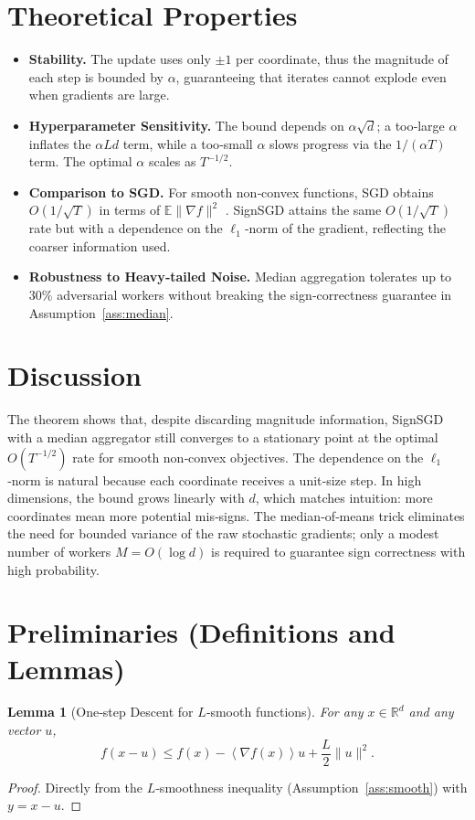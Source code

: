 \documentclass{article}
\newtheorem{lemma}{Lemma}
\newcommand{\E}{\mathbb{E}}
\newcommand{\R}{\mathbb{R}}
\newcommand{\inner}[1]{\left\langle#1\right\rangle}
\begin{document}
\section*{Theoretical Properties}
\begin{itemize}
\item \textbf{Stability.} The update uses only $\pm1$ per coordinate, thus the magnitude of each step is bounded by $\alpha$, guaranteeing that iterates cannot explode even when gradients are large.
\item \textbf{Hyperparameter Sensitivity.} The bound depends on $\alpha\sqrt{d}$; a too‑large $\alpha$ inflates the $ \alpha L d$ term, while a too‑small $\alpha$ slows progress via the $1/(\alpha T)$ term. The optimal $\alpha$ scales as $T^{-1/2}$.
\item \textbf{Comparison to SGD.} For smooth non‑convex functions, SGD obtains $O(1/\sqrt{T})$ in terms of $\E\|\nabla f\|^{2}$ \cite{ghadimi2013stochastic}.  SignSGD attains the same $O(1/\sqrt{T})$ rate but with a dependence on the $\ell_{1}$‑norm of the gradient, reflecting the coarser information used.
\item \textbf{Robustness to Heavy‑tailed Noise.} Median aggregation tolerates up to $30\%$ adversarial workers without breaking the sign‑correctness guarantee in Assumption~\ref{ass:median}.
\end{itemize}

\section*{Discussion}
The theorem shows that, despite discarding magnitude information, SignSGD with a median aggregator still converges to a stationary point at the optimal $O(T^{-1/2})$ rate for smooth non‑convex objectives.  The dependence on the $\ell_{1}$‑norm is natural because each coordinate receives a unit‑size step.  In high dimensions, the bound grows linearly with $d$, which matches intuition: more coordinates mean more potential mis‑signs.  The median‑of‑means trick eliminates the need for bounded variance of the raw stochastic gradients; only a modest number of workers $M=O(\log d)$ is required to guarantee sign correctness with high probability.

\newpage
\section*{Preliminaries (Definitions and Lemmas)}
\begin{lemma}[One‑step Descent for $L$‑smooth functions]\label{lem:descent}
For any $x\in\R^{d}$ and any vector $u$,
\[
f(x-u)\le f(x)-\inner{\nabla f(x)}{u}+\frac{L}{2}\|u\|^{2}.
\]
\end{lemma}
\begin{proof}
Directly from the $L$‑smoothness inequality (Assumption~\ref{ass:smooth}) with $y=x-u$.
\end{proof}
\end{document}
